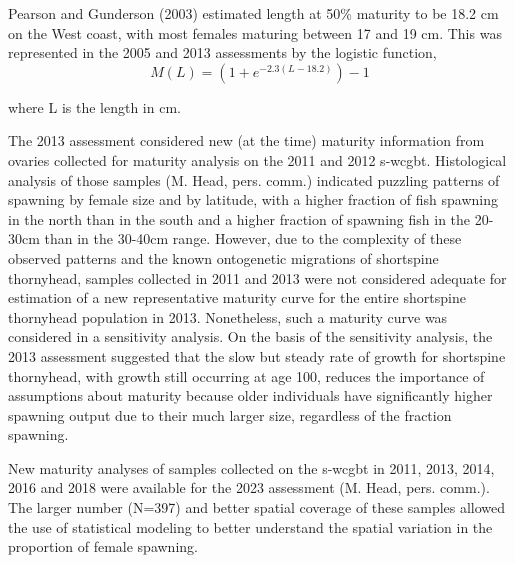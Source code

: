 \documentclass[11pt,
  english,
  letterpaper,
]{article}
\begin{document}
Pearson and Gunderson (2003) estimated length at 50\% maturity to be 18.2 cm on the West coast, with most females maturing between 17 and 19 cm. This was represented in the 2005 and 2013 assessments by the logistic function, \begin{equation} M(L) = (1 + e^{-2.3(L-18.2)})-1\end{equation}

where L is the length in cm.

The 2013 assessment considered new (at the time) maturity information from ovaries collected for maturity analysis on the 2011 and 2012 \gls{s-wcgbt}. Histological analysis of those samples (M. Head, pers. comm.) indicated puzzling patterns of spawning by female size and by latitude, with a higher fraction of fish spawning in the north than in the south and a higher fraction of spawning fish in the 20-30cm than in the 30-40cm range. However, due to the complexity of these observed patterns and the known ontogenetic migrations of shortspine thornyhead, samples collected in 2011 and 2013 were not considered adequate for estimation of a new representative maturity curve for the entire shortspine thornyhead population in 2013. Nonetheless, such a maturity curve was considered in a sensitivity analysis. On the basis of the sensitivity analysis, the 2013 assessment suggested that the slow but steady rate of growth for shortspine thornyhead, with growth still occurring at age 100, reduces the importance of assumptions about maturity because older individuals have significantly higher spawning output due to their much larger size, regardless of the fraction spawning.

New maturity analyses of samples collected on the \gls{s-wcgbt} in 2011, 2013, 2014, 2016 and 2018 were available for the 2023 assessment (M. Head, pers. comm.). The larger number (N=397) and better spatial coverage of these samples allowed the use of statistical modeling to better understand the spatial variation in the proportion of female spawning.
\end{document}
